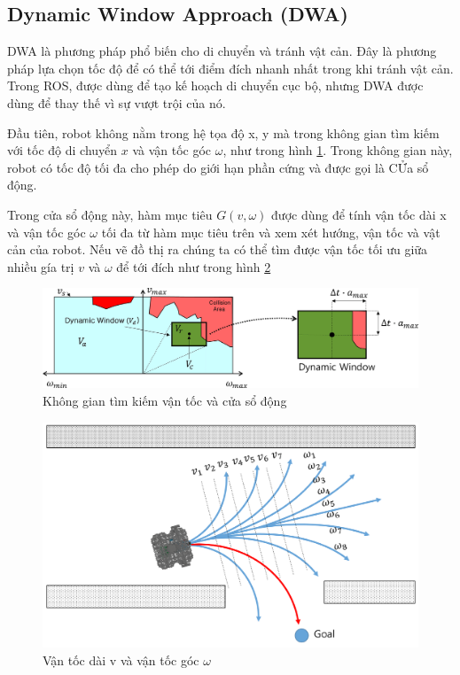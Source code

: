 {\subsection{Dynamic Window Approach (DWA)}
DWA là phương pháp phổ biến cho di chuyển và tránh vật cản. Đây là phương pháp lựa chọn tốc độ để có thể tới điểm đích nhanh nhất trong khi tránh vật cản. Trong ROS,  được dùng để tạo kế hoạch di chuyển cục bộ, nhưng DWA được dùng để thay thế vì sự vượt trội của nó.

Đầu tiên, robot không nằm trong hệ tọa độ x, y mà trong không gian tìm kiếm với tốc độ di chuyển $x$ và vận tốc góc $\omega$, như trong hình \figurename{\ref{fig:dwa}}. Trong không gian này, robot có tốc độ tối đa cho phép do giới hạn phần cứng và được gọi là CỬa sổ động.

Trong cửa sổ động này, hàm mục tiêu $G(v, \omega)$ được dùng để tính vận tốc dài x và vận tốc góc $\omega$ tối đa từ hàm mục tiêu trên và xem xét hướng, vận tốc và vật cản của robot. Nếu vẽ đồ thị ra chúng ta có thể tìm được vận tốc tối ưu giữa nhiều gía trị $v$ và $\omega$ để tới đích như trong hình \figurename{\ref{fig:dwa-search-velocity}}

\begin{figure}[htbp]
  \centering
  \includegraphics[width=1\linewidth]{figures/DWA.png}
  \caption{Không gian tìm kiếm vận tốc và cửa sổ động}
  \label{fig:dwa}
\end{figure}

\begin{figure}[htbp]
  \centering
  \includegraphics[width=0.8\linewidth]{figures/dwa-search-velocity.png}
  \caption{Vận tốc dài v và vận tốc góc $\omega$}
  \label{fig:dwa-search-velocity}
\end{figure}

}
